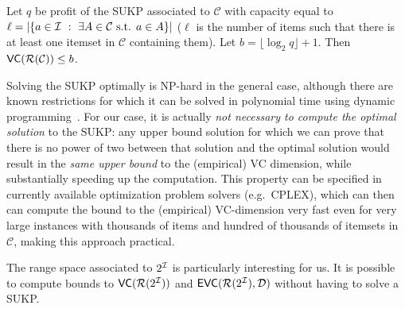 \begin{corollary}\label{lem:sukpvc}
  Let $q$ be profit of the SUKP associated to $\mathcal{C}$ with capacity
  equal to $\ell=|\{a\in{\cal I} ~:~ \exists A\in\mathcal{C} \mbox{ s.t. } a\in
  A\}|$ ($\ell$ is the number of items such that there is at least one itemset in $\mathcal{C}$ containing
  them).
  Let $b=\lfloor\log_2 q\rfloor + 1$. Then
  $\mathsf{VC}(\mathcal{R}(\mathcal{C}))\le b$. %
\end{corollary}

Solving the SUKP optimally is NP-hard in the general case, although there are known restrictions for
which it can be solved in polynomial time using dynamic
programming~\citep{GoldschmidtNY94}. 
For our case, it is actually \emph{not necessary to compute the optimal
solution} to the SUKP: any upper bound solution for which we can prove that
there is no power of two between that solution and the optimal solution would
result in the \emph{same upper bound} to the (empirical) VC dimension, while
substantially speeding up the computation. This property can be specified in
currently available optimization problem solvers (e.g.~CPLEX), which can then can compute the
bound to the (empirical) VC-dimension very fast even for very large instances
with thousands of items and hundred of thousands of itemsets in $\mathcal{C}$,
making this approach practical. %


The range space associated to $2^{\cal I}$
is particularly interesting for us. It is possible  %
to compute bounds to $\mathsf{VC}(\mathcal{R}(2^{\cal I}))$ and
$\mathsf{EVC}(\mathcal{R}(2^{\cal I}), {\cal D})$ without having to solve a SUKP.

